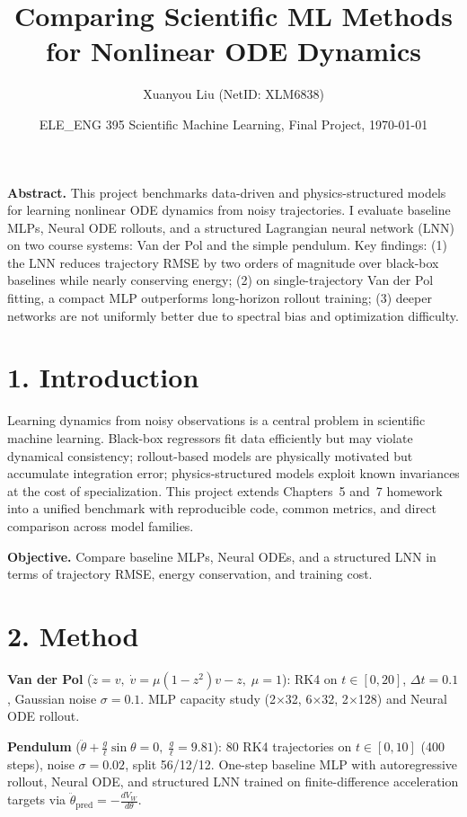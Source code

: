 \documentclass[10pt]{article}
\title{Comparing Scientific ML Methods for Nonlinear ODE Dynamics}
\author{Xuanyou Liu (NetID: XLM6838)}
\date{ELE\_ENG 395 Scientific Machine Learning, Final Project, \today}
\begin{document}
\maketitle

\textbf{Abstract.}
This project benchmarks data-driven and physics-structured models for learning nonlinear ODE dynamics from noisy trajectories.
I evaluate baseline MLPs, Neural ODE rollouts, and a structured Lagrangian neural network (LNN) on two course systems: Van der Pol and the simple pendulum.
Key findings: (1) the LNN reduces trajectory RMSE by two orders of magnitude over black-box baselines while nearly conserving energy; (2) on single-trajectory Van der Pol fitting, a compact MLP outperforms long-horizon rollout training; (3) deeper networks are not uniformly better due to spectral bias and optimization difficulty.

\section*{1. Introduction}
Learning dynamics from noisy observations is a central problem in scientific machine learning.
Black-box regressors fit data efficiently but may violate dynamical consistency; rollout-based models are physically motivated but accumulate integration error; physics-structured models exploit known invariances at the cost of specialization.
This project extends Chapters~5 and~7 homework into a unified benchmark with reproducible code, common metrics, and direct comparison across model families.

\textbf{Objective.}
Compare baseline MLPs, Neural ODEs, and a structured LNN in terms of trajectory RMSE, energy conservation, and training cost.

\section*{2. Method}

\textbf{Van der Pol} ($\dot{z}{=}v,\;\dot{v}{=}\mu(1{-}z^2)v{-}z,\;\mu{=}1$):
RK4 on $t\!\in\![0,20]$, $\Delta t{=}0.1$, Gaussian noise $\sigma{=}0.1$.
MLP capacity study (2$\times$32, 6$\times$32, 2$\times$128) and Neural ODE rollout.

\textbf{Pendulum} ($\ddot{\theta}{+}\frac{g}{\ell}\sin\theta{=}0,\;\frac{g}{\ell}{=}9.81$):
80 RK4 trajectories on $t\!\in\![0,10]$ (400 steps), noise $\sigma{=}0.02$, split 56/12/12.
One-step baseline MLP with autoregressive rollout, Neural ODE, and structured LNN trained on finite-difference acceleration targets via $\ddot{\theta}_{\text{pred}}{=}{-}\frac{dV_W}{d\theta}$.
\end{document}
